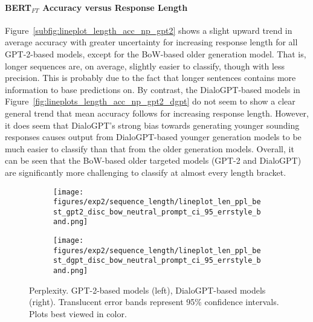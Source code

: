 
\paragraph{BERT$_{FT}$ Accuracy versus Response Length} Figure~\ref{subfig:lineplot_length_acc_np_gpt2} shows a slight upward trend in average accuracy with greater uncertainty for increasing response length for all GPT-2-based models, except for the BoW-based older generation model. That is, longer sequences are, on average, slightly easier to classify, though with less precision. This is probably due to the fact that longer sentences contains more information to base predictions on. 
By contrast, the DialoGPT-based models in Figure~\ref{fig:lineplots_length_acc_np_gpt2_dgpt} do not seem to show a clear general trend that mean accuracy follows for increasing response length. However, it does seem that DialoGPT's strong bias towards generating younger sounding responses causes output from DialoGPT-based younger generation models to be much easier to classify than that from the older generation models. Overall, it can be seen that the BoW-based older targeted models (GPT-2 and DialoGPT) are significantly more challenging to classify at almost every length bracket.

\begin{figure}[H]
     \centering
     \begin{subfigure}[b]{0.49\textwidth}
        \centering
\texttt{[image: figures/exp2/sequence\_length/lineplot\_len\_ppl\_best\_gpt2\_disc\_bow\_neutral\_prompt\_ci\_95\_errstyle\_band.png]}
        \caption{}
        \label{subfig:lineplot_length_ppl_np_gpt2}
     \end{subfigure}
     \hfill
     \begin{subfigure}[b]{0.49\textwidth}
        \centering
        \texttt{[image: figures/exp2/sequence\_length/lineplot\_len\_ppl\_best\_dgpt\_disc\_bow\_neutral\_prompt\_ci\_95\_errstyle\_band.png]}
        \caption{}
        \label{subfig:lineplot_length_ppl_np_dgpt}
     \end{subfigure}
        \caption{Perplexity. GPT-2-based models (left), DialoGPT-based models (right). Translucent error bands represent 95\% confidence intervals. Plots best viewed in color.}
        \label{fig:lineplots_length_ppl_np_gpt2_dgpt}
\end{figure}

